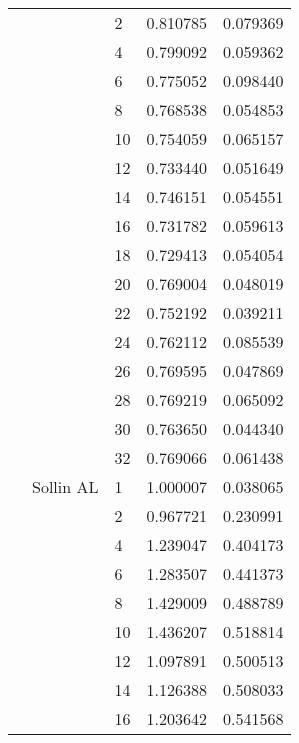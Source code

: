 \begin{tabular}{lllrr}
                      &            & 2  &  0.810785 &  0.079369 \\
                      &            & 4  &  0.799092 &  0.059362 \\
                      &            & 6  &  0.775052 &  0.098440 \\
                      &            & 8  &  0.768538 &  0.054853 \\
                      &            & 10 &  0.754059 &  0.065157 \\
                      &            & 12 &  0.733440 &  0.051649 \\
                      &            & 14 &  0.746151 &  0.054551 \\
                      &            & 16 &  0.731782 &  0.059613 \\
                      &            & 18 &  0.729413 &  0.054054 \\
                      &            & 20 &  0.769004 &  0.048019 \\
                      &            & 22 &  0.752192 &  0.039211 \\
                      &            & 24 &  0.762112 &  0.085539 \\
                      &            & 26 &  0.769595 &  0.047869 \\
                      &            & 28 &  0.769219 &  0.065092 \\
                      &            & 30 &  0.763650 &  0.044340 \\
                      &            & 32 &  0.769066 &  0.061438 \\
                      & Sollin AL & 1  &  1.000007 &  0.038065 \\
                      &            & 2  &  0.967721 &  0.230991 \\
                      &            & 4  &  1.239047 &  0.404173 \\
                      &            & 6  &  1.283507 &  0.441373 \\
                      &            & 8  &  1.429009 &  0.488789 \\
                      &            & 10 &  1.436207 &  0.518814 \\
                      &            & 12 &  1.097891 &  0.500513 \\
                      &            & 14 &  1.126388 &  0.508033 \\
                      &            & 16 &  1.203642 &  0.541568 \\

\end{tabular}
